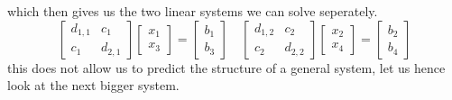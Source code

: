 \documentclass{article}
\begin{document}
which then gives us the two linear systems we can solve seperately.
\begin{equation*}
    \begin{bmatrix}
        d_{1,1} & c_{1} \\
        c_{1} & d_{2,1}
    \end{bmatrix}
    \begin{bmatrix}
        x_{1} \\
        x_{3}
    \end{bmatrix} = 
    \begin{bmatrix}
        b_{1} \\
        b_{3}
    \end{bmatrix} \quad \begin{bmatrix}
        d_{1,2} & c_{2} \\
        c_{2} & d_{2,2}
    \end{bmatrix} \begin{bmatrix}
        x_{2} \\
        x_{4}
    \end{bmatrix} = 
    \begin{bmatrix}
        b_{2} \\
        b_{4}
    \end{bmatrix}
\end{equation*}
this does not allow us to predict the structure of a general system, let us hence look at the next bigger system.
\end{document}
